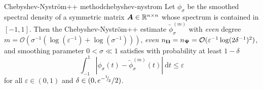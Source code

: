 \documentclass[12pt]{article}
\begin{document}
\begin{theorem}{Chebyshev-Nyström++ method}{chebyshev-nystrom}
    Let $\phi_{\sigma}$ be the smoothed spectral density of a symmetric matrix $\boldsymbol{A} \in \mathbb{R}^{n \times n}$ whose spectrum is contained in $[-1, 1]$. Then the Chebyshev-Nyström++ estimate $\widetilde{\phi}_{\sigma}^{(m)}$ with \emph{even} degree $m = \mathcal{O}(\sigma^{-1}(\log(\varepsilon^{-1}) + \log(\sigma^{-1})))$, \emph{even} $n_{\boldsymbol{\Omega}} = n_{\boldsymbol{\Psi}} = \mathcal{O}(\varepsilon^{-1}\log(2\delta^{-1})^2)$, and smoothing parameter $0 < \sigma \ll 1$ satisfies with probability at least $1 - \delta$
    \begin{equation}
        \int_{-1}^{1} \left| \phi_{\sigma}(t) - \widetilde{\phi}_{\sigma}^{(m)}(t) \right|~\mathrm{d}t \leq \varepsilon
        \label{equ:chebyshev-nystrom-error}
    \end{equation}
    for all $\varepsilon \in (0, 1)$ and $\delta \in (0, e^{-{}^{1}{\mskip -5mu/\mskip -3mu}_{2}}/2)$.
\end{theorem}
\end{document}
